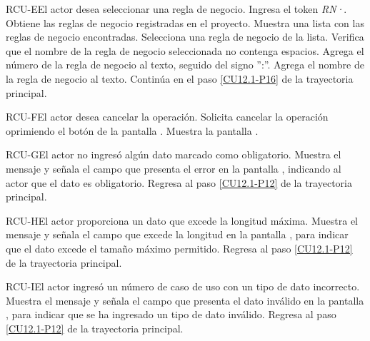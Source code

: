 	\begin{UCtrayectoriaA}{RCU-E}{El actor desea seleccionar una regla de negocio.}
		\UCpaso[\UCactor] Ingresa el token {\em RN·}. 
		\UCpaso[\UCsist] Obtiene las reglas de negocio registradas en el proyecto.
		\UCpaso[\UCsist] Muestra una lista con las reglas de negocio encontradas.
		\UCpaso[\UCactor] Selecciona una regla de negocio de la lista.
		\UCpaso[\UCsist] Verifica que el nombre de la regla de negocio seleccionada no contenga espacios. 
		\UCpaso[\UCsist] Agrega el número de la regla de negocio al texto, seguido del signo '':''.
		\UCpaso[\UCsist] Agrega el nombre de la regla de negocio al texto.
		\UCpaso Continúa en el paso \ref{CU12.1-P16} de la trayectoria principal.
	\end{UCtrayectoriaA}

	\begin{UCtrayectoriaA}{RCU-F}{El actor desea cancelar la operación.}
		\UCpaso[\UCactor] Solicita cancelar la operación oprimiendo el botón  de la pantalla .
		\UCpaso[\UCsist] Muestra la pantalla .
	\end{UCtrayectoriaA}

	\begin{UCtrayectoriaA}{RCU-G}{El actor no ingresó algún dato marcado como obligatorio.}
		\UCpaso[\UCsist] Muestra el mensaje  y señala el campo que presenta el error en la pantalla , indicando al actor que el dato es obligatorio.
		\UCpaso Regresa al paso \ref{CU12.1-P12} de la trayectoria principal.
	\end{UCtrayectoriaA}

	\begin{UCtrayectoriaA}{RCU-H}{El actor proporciona un dato que excede la longitud máxima.}
		\UCpaso[\UCsist] Muestra el mensaje  y señala el campo que excede la longitud en la pantalla , para indicar que el dato excede el tamaño máximo permitido.
		\UCpaso Regresa al paso \ref{CU12.1-P12} de la trayectoria principal.
	\end{UCtrayectoriaA}

	\begin{UCtrayectoriaA}{RCU-I}{El actor ingresó un número de caso de uso con un tipo de dato incorrecto.}
		\UCpaso[\UCsist] Muestra el mensaje  y señala el campo que presenta el dato inválido en la pantalla , para indicar que se ha ingresado un tipo de dato inválido.
		\UCpaso Regresa al paso \ref{CU12.1-P12} de la trayectoria principal.
	\end{UCtrayectoriaA}

